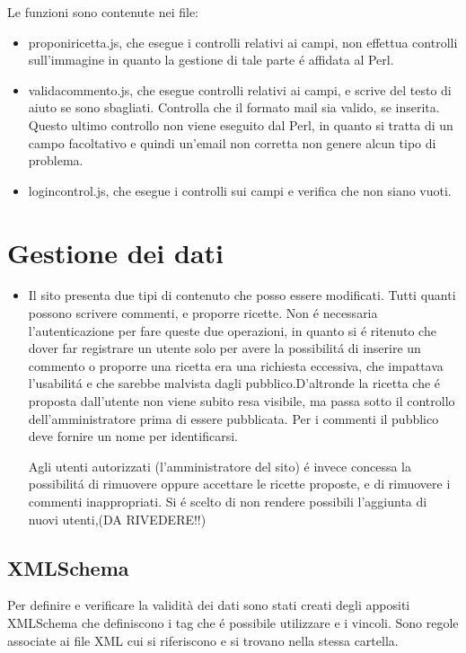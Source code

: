 \documentclass[12pt]{article}
\begin{document}
\begin{itemize}
				Le funzioni sono contenute nei file:
				\begin{itemize}
					\item proponiricetta.js, che esegue i controlli relativi ai campi, non effettua controlli sull'immagine in quanto la gestione di tale parte \'e affidata al Perl.
				\end{itemize}
				\begin{itemize}
					\item validacommento.js, che esegue controlli relativi ai campi, e scrive del testo di aiuto se sono sbagliati. Controlla che il formato mail sia valido, se inserita. Questo ultimo controllo non viene eseguito dal Perl, in quanto si tratta di un campo facoltativo e quindi un'email non corretta non genere alcun tipo di problema. 
				\end{itemize}
				\begin{itemize}
					\item logincontrol.js, che esegue i controlli sui campi e verifica che non siano vuoti.
				\end{itemize}	
			\end{itemize}
		
		\section{Gestione dei dati}
		\begin{itemize}
			\item Il sito presenta due tipi di contenuto che posso essere modificati.
			Tutti quanti possono scrivere commenti, e proporre ricette. Non \'e necessaria l'autenticazione per fare queste due operazioni, in quanto si \'e ritenuto che dover far registrare un utente solo per avere la possibilit\'a di inserire un commento o proporre una ricetta era una richiesta eccessiva, che impattava l'usabilit\'a e che sarebbe malvista dagli pubblico.D'altronde la ricetta che \'e proposta dall'utente non viene subito resa visibile, ma passa sotto il controllo dell'amministratore prima di essere pubblicata.
			Per i commenti il pubblico deve fornire un nome per identificarsi.
			
			
			Agli utenti autorizzati (l'amministratore del sito) \'e invece concessa la possibilit\'a di rimuovere oppure accettare le ricette proposte, e di rimuovere i commenti inappropriati. Si \'e scelto di non rendere possibili l'aggiunta di nuovi utenti,(DA RIVEDERE!!)
		\end{itemize}
		\subsection{XMLSchema}
		Per definire e verificare la validità dei dati sono stati creati degli appositi XMLSchema che definiscono i tag che \'e possibile utilizzare e i vincoli.
		Sono regole associate ai file XML cui si riferiscono e si trovano nella stessa cartella.
			
\end{document}
